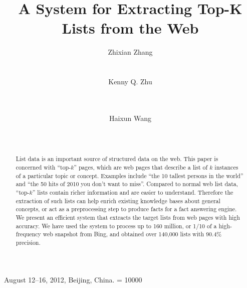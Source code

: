 \documentclass[conference,letterpaper]{sig-alternate}
\begin{document}
 {August 12--16, 2012, Beijing, China.}
\widowpenalty = 10000
\title{A System for Extracting Top-K Lists from the Web}
\author{
\alignauthor
Zhixian Zhang\\
       \\
       \\
\alignauthor
Kenny Q. Zhu \\
       \\
       \\
\and
\alignauthor
Haixun Wang\\
       \\
       \\
}
\maketitle

\begin{abstract}
List data is an important source of structured data on the web. 
This paper is concerned with ``top-$k$'' pages, which are
web pages that describe a list of $k$ instances of a
particular topic or concept. Examples include ``the
10 tallest persons in the world'' and ``the 50 hits of 2010 you 
don't want to miss''. 
Compared to normal web list data, 
``top-$k$'' lists contain richer information and are easier to understand.
Therefore the extraction of such lists can help
enrich existing knowledge bases about general concepts, or
act as a preprocessing step to produce facts for a fact answering engine.
We present an efficient system
that extracts the target lists from web pages with high accuracy.
We have used the system to process up to 160 million, or
1/10 of a high-frequency web snapshot from Bing, and obtained
over 140,000 lists with 90.4\% precision. 
\end{abstract}
\end{document}
